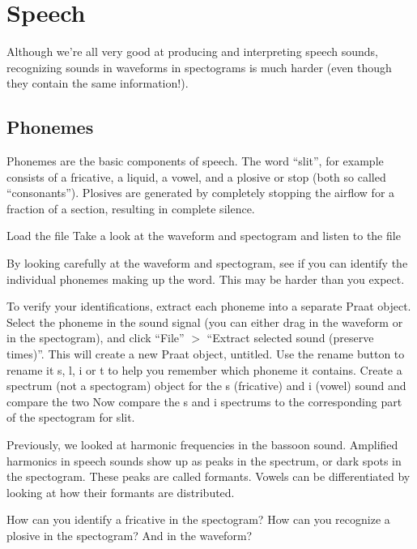 \documentclass[a4paper, 9pt]{article}
\begin{document}
\section{Speech}\label{speech}

Although we're all very good at producing and interpreting speech
sounds, recognizing sounds in waveforms in spectograms is much harder
(even though they contain the same information!).

\subsection{Phonemes}\label{phonemes}

Phonemes are the basic components of speech. The word ``slit'', for
example consists of a fricative, a liquid, a vowel, and a plosive or
stop (both so called ``consonants''). Plosives are generated by
completely stopping the airflow for a fraction of a section, resulting
in complete silence.

\begin{exercise}
\action Load the file 
\action Take a look at the waveform and spectogram and listen to the file
\end{exercise}

By looking carefully at the waveform and spectogram, see if you can
identify the individual phonemes making up the word. This may be harder
than you expect.

\begin{exercise}
\action To verify your identifications, extract each phoneme into a separate Praat object. Select the phoneme in the sound signal (you can either drag in the waveform or in the spectogram), and click ``File'' $>$ ``Extract selected sound (preserve times)''. This will create a new Praat object, untitled. Use the rename button to rename it s, l, i or t to help you remember which phoneme it contains. 
\action Create a spectrum (not a spectogram) object for the s (fricative) and i (vowel) sound and compare the two
\action Now compare the s and i spectrums to the corresponding part of the spectogram for slit. 
\end{exercise}

Previously, we looked at harmonic frequencies in the bassoon sound.
Amplified harmonics in speech sounds show up as peaks in the spectrum,
or dark spots in the spectogram. These peaks are called formants. Vowels
can be differentiated by looking at how their formants are distributed.

\begin{exercise}
\ask How can you identify a fricative in the spectogram?
\askstar How can you recognize a plosive in the spectogram? And in the waveform?
\end{exercise}
\end{document}
